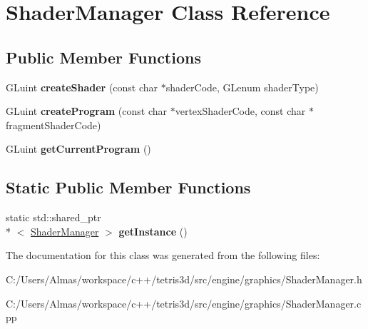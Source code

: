 \hypertarget{class_shader_manager}{\section{Shader\-Manager Class Reference}
\label{class_shader_manager}
}
\subsection*{Public Member Functions}
\begin{DoxyCompactItemize}
\item 
\hypertarget{class_shader_manager_a3874f8f9f55a64da06f78b937781106d}{G\-Luint {\bfseries create\-Shader} (const char $\ast$shader\-Code, G\-Lenum shader\-Type)}\label{class_shader_manager_a3874f8f9f55a64da06f78b937781106d}

\item 
\hypertarget{class_shader_manager_a1b8c6c1659eb531f0066aa99dd8951ee}{G\-Luint {\bfseries create\-Program} (const char $\ast$vertex\-Shader\-Code, const char $\ast$fragment\-Shader\-Code)}\label{class_shader_manager_a1b8c6c1659eb531f0066aa99dd8951ee}

\item 
\hypertarget{class_shader_manager_a45f10b2fade81053fa94ececf34fc12a}{G\-Luint {\bfseries get\-Current\-Program} ()}\label{class_shader_manager_a45f10b2fade81053fa94ececf34fc12a}

\end{DoxyCompactItemize}
\subsection*{Static Public Member Functions}
\begin{DoxyCompactItemize}
\item 
\hypertarget{class_shader_manager_a55c88ded137dfa71c81f63bee863d867}{static std\-::shared\-\_\-ptr\\*
$<$ \hyperlink{class_shader_manager}{Shader\-Manager} $>$ {\bfseries get\-Instance} ()}\label{class_shader_manager_a55c88ded137dfa71c81f63bee863d867}

\end{DoxyCompactItemize}


The documentation for this class was generated from the following files\-:\begin{DoxyCompactItemize}
\item 
C\-:/\-Users/\-Almas/workspace/c++/tetris3d/src/engine/graphics/Shader\-Manager.\-h\item 
C\-:/\-Users/\-Almas/workspace/c++/tetris3d/src/engine/graphics/Shader\-Manager.\-cpp\end{DoxyCompactItemize}
